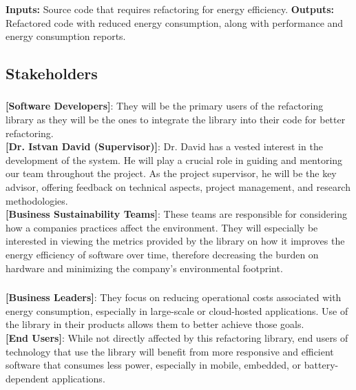 \documentclass{article}
\begin{document}
\textbf{Inputs:} Source code that requires refactoring for energy efficiency.
\textbf{Outputs:} Refactored code with reduced energy consumption, along with performance and energy consumption reports.

\subsection{Stakeholders}
\subsubsection*{\color{blue}{Direct Stakeholders}}
\textbf{[Software Developers]}: They will be the primary users of the refactoring library as they will be the ones to integrate the library into their code for better refactoring.\\

\noindent
\textbf{[Dr. Istvan David (Supervisor)]}: Dr. David has a vested interest in the development of the system. He will play a crucial role in guiding and mentoring our team throughout the project. As the project supervisor, he will be the key advisor, offering feedback on technical aspects, project management, and research methodologies. \\

\noindent
\textbf{[Business Sustainability Teams]}: These teams are responsible for considering how a companies practices affect the environment. They will especially be interested in viewing the metrics provided by the library on how it improves the energy efficiency of software over time, therefore decreasing the burden on hardware and minimizing the company's environmental footprint.

\subsubsection*{\color{blue}{Indirect Stakeholders}}
\textbf{[Business Leaders]}: They focus on reducing operational costs associated with energy consumption, especially in large-scale or cloud-hosted applications. Use of the library in their products allows them to better achieve those goals. \\

\noindent
\textbf{[End Users]}: While not directly affected by this refactoring library, end users of technology that use the library will benefit from more responsive and efficient software that consumes less power, especially in mobile, embedded, or battery-dependent applications. \\
\end{document}
